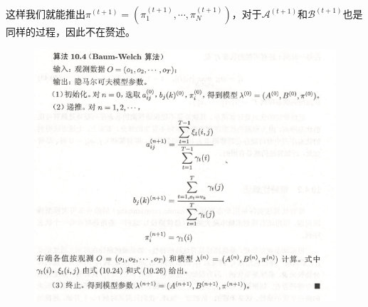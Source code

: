 这样我们就能推出$\pi^{(t+1)}=(\pi^{(t+1)}_1,\cdots,\pi^{(t+1)}_N)$，对于$\mathcal{A}^{(t+1)}$和$\mathcal{B}^{(t+1)}$也是同样的过程，因此不在赘述。

\begin{figure}[H]
    \centering
    \includegraphics[scale=0.7]{figures/Baum-Welch算法.png}
\end{figure}
